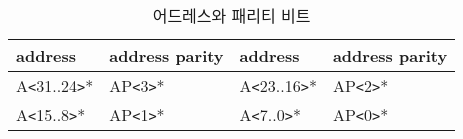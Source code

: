 %
%
\begin{table}[htbp]
\caption{어드레스와 패리티 비트}
   \begin{center}
   \begin{tabular}{|l|l||l|l|} \hline
      address & address parity & address & address parity \\ \hline \hline
      A{\tt <}31..24{\tt >}* & AP{\tt <}3{\tt >}* &
      A{\tt <}23..16{\tt >}* & AP{\tt <}2{\tt >}* \\ \hline
      A{\tt <}15..8{\tt >}* & AP{\tt <}1{\tt >}* &
      A{\tt <}7..0{\tt >}* & AP{\tt <}0{\tt >}* \\ \hline
   \end{tabular}
   \end{center}
\end{table}
%
%
